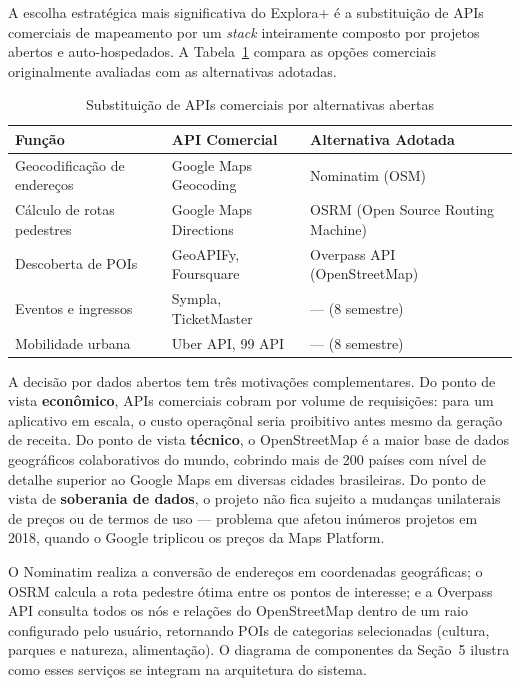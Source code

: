 \documentclass[12pt, a4paper]{article}
\begin{document}
A escolha estrat\'egica mais significativa do Explora+ \'e a substitui\c{c}\~ao de APIs comerciais de mapeamento por um \emph{stack} inteiramente composto por projetos abertos e auto-hospedados. A Tabela~\ref{tab:apis} compara as op\c{c}\~oes comerciais originalmente avaliadas com as alternativas adotadas.

\begin{table}[H]
\centering
\caption{Substitui\c{c}\~ao de APIs comerciais por alternativas abertas}
\label{tab:apis}
\small
\begin{tabular}{p{3.8cm}p{3.8cm}p{4.8cm}}
\toprule
\textbf{Fun\c{c}\~ao} & \textbf{API Comercial} & \textbf{Alternativa Adotada} \\
\midrule
Geocodifica\c{c}\~ao de endere\c{c}os & Google Maps Geocoding & Nominatim (OSM) \\
C\'alculo de rotas pedestres & Google Maps Directions & OSRM (Open Source Routing Machine) \\
Descoberta de POIs & GeoAPIFy, Foursquare & Overpass API (OpenStreetMap) \\
Eventos e ingressos & Sympla, TicketMaster & --- (8\textordmasculine{} semestre) \\
Mobilidade urbana & Uber API, 99 API & --- (8\textordmasculine{} semestre) \\
\bottomrule
\end{tabular}
\end{table}

A decis\~ao por dados abertos tem tr\^es motiva\c{c}\~oes complementares. Do ponto de vista \textbf{econ\^omico}, APIs comerciais cobram por volume de requisi\c{c}\~oes: para um aplicativo em escala, o custo opera\c{c}\~onal seria proibitivo antes mesmo da gera\c{c}\~ao de receita. Do ponto de vista \textbf{t\'ecnico}, o OpenStreetMap \parencite{osm2024} \'e a maior base de dados geogr\'aficos colaborativos do mundo, cobrindo mais de 200 pa\'ises com n\'ivel de detalhe superior ao Google Maps em diversas cidades brasileiras. Do ponto de vista de \textbf{soberania de dados}, o projeto n\~ao fica sujeito a mudan\c{c}as unilaterais de pre\c{c}os ou de termos de uso --- problema que afetou in\'umeros projetos em 2018, quando o Google triplicou os pre\c{c}os da Maps Platform.

O Nominatim realiza a convers\~ao de endere\c{c}os em coordenadas geogr\'aficas; o OSRM calcula a rota pedestre \'otima entre os pontos de interesse; e a Overpass API consulta todos os n\'os e rela\c{c}\~oes do OpenStreetMap dentro de um raio configurado pelo usu\'ario, retornando POIs de categorias selecionadas (cultura, parques e natureza, alimenta\c{c}\~ao). O diagrama de componentes da Se\c{c}\~ao~5 ilustra como esses servi\c{c}os se integram na arquitetura do sistema.
\end{document}
